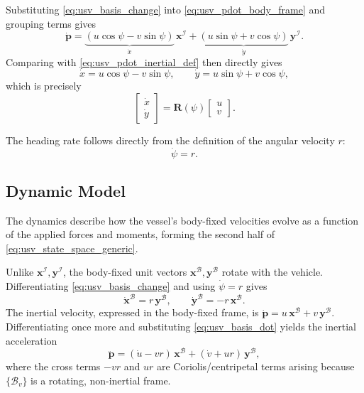 Substituting \eqref{eq:usv_basis_change} into \eqref{eq:usv_pdot_body_frame} and grouping terms gives
\begin{equation}
    \dot{\mathbf{p}} = \underbrace{(u\cos\psi - v\sin\psi)}_{\dot{x}}\,\mathbf{x}^{\mathcal{I}} + \underbrace{(u\sin\psi + v\cos\psi)}_{\dot{y}}\,\mathbf{y}^{\mathcal{I}}.
    \label{eq:usv_pdot_expanded}
\end{equation}
Comparing with \eqref{eq:usv_pdot_inertial_def} then directly gives
\begin{equation}
    \dot{x} = u\cos\psi - v\sin\psi, \qquad \dot{y} = u\sin\psi + v\cos\psi,
\end{equation}
which is precisely
\begin{equation}
    \label{eq:usv_kinematics_planar}
    \begin{bmatrix} \dot{x} \\ \dot{y} \end{bmatrix} = \mathbf{R}(\psi)\begin{bmatrix} u \\ v \end{bmatrix}.
\end{equation}

The heading rate follows directly from the definition of the angular velocity $r$:
\begin{equation}
    \dot{\psi} = r. \label{eq:usv_psi_dot}
\end{equation}

\subsection{Dynamic Model}
\label{subsec:mod_usv_dynamics}

The dynamics describe how the vessel's body-fixed velocities evolve as a function of the applied forces and moments, forming the second half of \eqref{eq:usv_state_space_generic}.

Unlike $\mathbf{x}^{\mathcal{I}}, \mathbf{y}^{\mathcal{I}}$, the body-fixed unit vectors $\mathbf{x}^{\mathcal{B}}, \mathbf{y}^{\mathcal{B}}$ rotate with the vehicle. Differentiating \eqref{eq:usv_basis_change} and using $\dot\psi = r$ gives
\begin{equation}
    \dot{\mathbf{x}}^{\mathcal{B}} = r\,\mathbf{y}^{\mathcal{B}}, \qquad \dot{\mathbf{y}}^{\mathcal{B}} = -r\,\mathbf{x}^{\mathcal{B}}.
    \label{eq:usv_basis_dot}
\end{equation}
The inertial velocity, expressed in the body-fixed frame, is $\dot{\mathbf{p}} = u\,\mathbf{x}^{\mathcal{B}} + v\,\mathbf{y}^{\mathcal{B}}$. Differentiating once more and substituting \eqref{eq:usv_basis_dot} yields the inertial acceleration
\begin{equation}
    \ddot{\mathbf{p}} = (\dot{u} - vr)\,\mathbf{x}^{\mathcal{B}} + (\dot{v} + ur)\,\mathbf{y}^{\mathcal{B}},
    \label{eq:usv_pddot_body_frame}
\end{equation}
where the cross terms $-vr$ and $ur$ are Coriolis/centripetal terms arising because $\{\mathcal{B}_v\}$ is a rotating, non-inertial frame.

